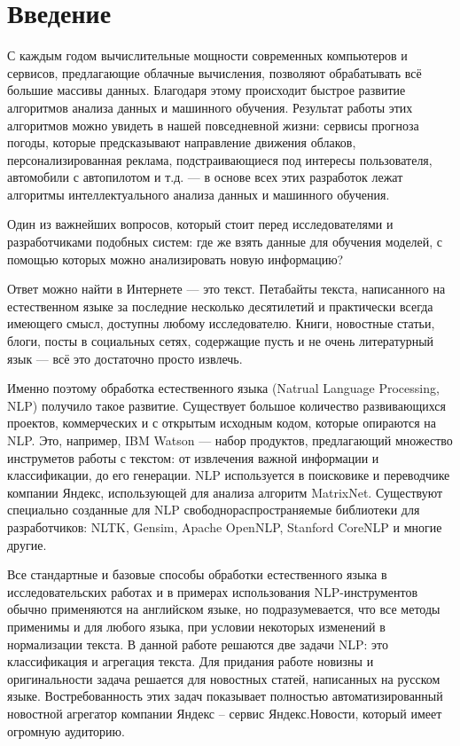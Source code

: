 \documentclass[a4paper, 14pt]{extarticle}
\begin{document}

\section{Введение}
С каждым годом вычислительные мощности современных компьютеров и сервисов, предлагающие облачные вычисления, позволяют 
обрабатывать всё большие массивы данных. Благодаря этому происходит быстрое развитие алгоритмов анализа данных и машинного обучения. Результат работы этих алгоритмов можно увидеть в нашей повседневной жизни: 
сервисы прогноза погоды, которые предсказывают направление движения облаков, персонализированная реклама, подстраивающиеся под 
интересы пользователя, автомобили с автопилотом и т.д. --- в основе всех этих разработок лежат алгоритмы интеллектуального анализа данных и машинного обучения.

Один из важнейших вопросов, который стоит перед исследователями и разработчиками подобных систем: где же взять данные для обучения моделей, с помощью которых можно анализировать новую информацию?

Ответ можно найти в Интернете --- это текст. Петабайты текста, написанного на естественном языке за последние несколько 
десятилетий и практически всегда имеющего смысл, доступны любому исследователю. Книги, новостные статьи, блоги, посты в 
социальных сетях, содержащие пусть и не очень литературный язык --- всё это достаточно просто извлечь.

Именно поэтому обработка естественного языка (Natrual Language Processing, NLP) получило такое развитие. Существует 
большое количество развивающихся проектов, коммерческих и с открытым исходным кодом, которые опираются на NLP. Это, например, IBM 
Watson --- набор продуктов, предлагающий множество инструметов работы с текстом: от извлечения важной информации и 
классификации, до его генерации. %
NLP используется в поисковике и переводчике компании Яндекс, использующей для анализа алгоритм MatrixNet. %
Существуют специально созданные для NLP свободнораспространяемые библиотеки для разработчиков: NLTK, Gensim, Apache 
OpenNLP, Stanford CoreNLP и многие другие.

Все стандартные и базовые способы обработки естественного языка в исследовательских работах и в примерах использования 
NLP-инструментов обычно применяются на английском языке, но подразумевается, что все методы применимы и для любого 
языка, при условии некоторых изменений в нормализации текста.
В данной работе решаются две задачи NLP: это классификация и агрегация текста. Для придания работе новизны и 
оригинальности задача решается для новостных статей, написанных на русском языке. Востребованность этих задач 
показывает полностью автоматизированный новостной агрегатор компании Яндекс -- сервис Яндекс.Новости, который имеет 
огромную аудиторию. %
\end{document}
